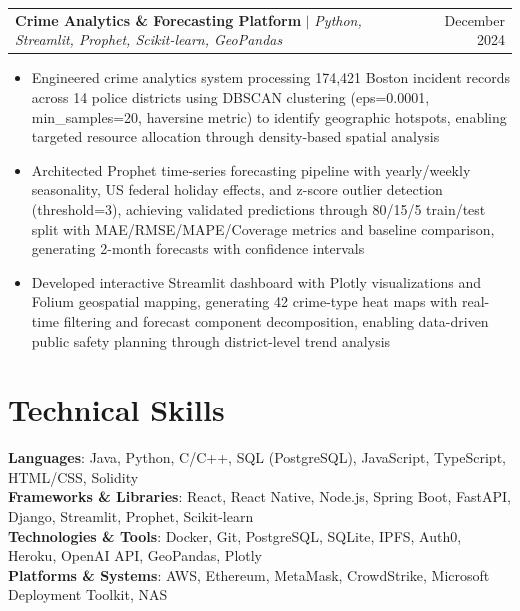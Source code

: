 \documentclass[letterpaper,11pt]{article}
\makeatletter
\newcommand{\resumeItem}[1]{
  \item\small{
    {#1 \vspace{-2pt}}
  }
}
\newcommand{\resumeProjectHeading}[2]{
    \item
    \begin{tabular*}{0.97\textwidth}{l@{\extracolsep{\fill}}r}
      \small#1 & #2 \\
    \end{tabular*}\vspace{-7pt}
}
\newcommand{\resumeItemListStart}{\begin{itemize}}
\newcommand{\resumeItemListEnd}{\end{itemize}\vspace{-5pt}}
\makeatother
\begin{document}
        \resumeProjectHeading
        {\textbf{Crime Analytics \& Forecasting Platform} $|$ \emph{Python, Streamlit, Prophet, Scikit-learn, GeoPandas}}{December 2024}
        \resumeItemListStart
            \resumeItem{Engineered crime analytics system processing 174,421 Boston incident records across 14 police districts using DBSCAN clustering (eps=0.0001, min\_samples=20, haversine metric) to identify geographic hotspots, enabling targeted resource allocation through density-based spatial analysis}
            \resumeItem{Architected Prophet time-series forecasting pipeline with yearly/weekly seasonality, US federal holiday effects, and z-score outlier detection (threshold=3), achieving validated predictions through 80/15/5 train/test split with MAE/RMSE/MAPE/Coverage metrics and baseline comparison, generating 2-month forecasts with confidence intervals}
            \resumeItem{Developed interactive Streamlit dashboard with Plotly visualizations and Folium geospatial mapping, generating 42 crime-type heat maps with real-time filtering and forecast component decomposition, enabling data-driven public safety planning through district-level trend analysis}
        \resumeItemListEnd

%
\section{Technical Skills}
 \begin{itemize}[leftmargin=0.15in, label={}]
    \small{\item{
     \textbf{Languages}{: Java, Python, C/C++, SQL (PostgreSQL), JavaScript, TypeScript, HTML/CSS, Solidity} \\
     \textbf{Frameworks \& Libraries}{: React, React Native, Node.js, Spring Boot, FastAPI, Django, Streamlit, Prophet, Scikit-learn} \\
     \textbf{Technologies \& Tools}{: Docker, Git, PostgreSQL, SQLite, IPFS, Auth0, Heroku, OpenAI API, GeoPandas, Plotly} \\
     \textbf{Platforms \& Systems}{: AWS, Ethereum, MetaMask, CrowdStrike, Microsoft Deployment Toolkit, NAS}
    }}
 \end{itemize}


\end{document}

